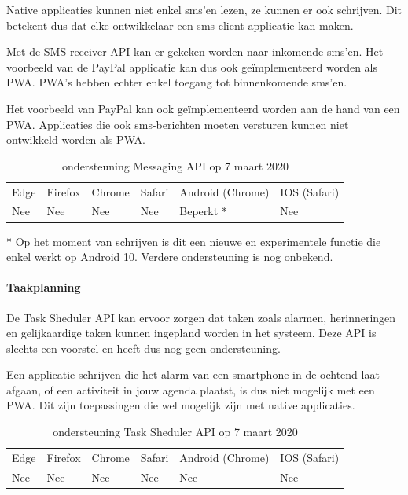 Native applicaties kunnen niet enkel sms’en lezen, ze kunnen er ook schrijven. Dit betekent dus dat elke ontwikkelaar een sms-client applicatie kan maken.

Met de SMS-receiver API \autocite{Fullea2015} kan er gekeken worden naar inkomende sms’en. Het voorbeeld van de PayPal applicatie kan dus ook geïmplementeerd worden als PWA. PWA's hebben echter enkel toegang tot binnenkomende sms’en. 

Het voorbeeld van PayPal kan ook geïmplementeerd worden aan de hand van een PWA. Applicaties die ook sms-berichten moeten versturen kunnen niet ontwikkeld worden als PWA.

\begin{table}[H]
	\centering
	\begin{tabular}{llllll}
		Edge & Firefox & Chrome & Safari & Android (Chrome) & IOS (Safari) \\
		Nee   & Nee      &  Nee     & Nee     & Beperkt *             & Nee          
	\end{tabular}	
	\caption{ondersteuning Messaging API op 7 maart 2020}{* Op het moment van schrijven is dit een nieuwe en experimentele functie die enkel werkt op 
		Android 10. Verdere ondersteuning is nog onbekend.}
\end{table}	



\paragraph{Taakplanning}
De Task Sheduler API \autocite{Kulkarni2015} kan ervoor zorgen dat taken zoals alarmen, herinneringen en gelijkaardige taken kunnen ingepland worden in het systeem. Deze API is slechts een voorstel en heeft dus nog geen ondersteuning.

Een applicatie schrijven die het alarm van een smartphone in de ochtend laat afgaan, of een activiteit in jouw agenda plaatst, is dus niet mogelijk met een PWA. Dit zijn toepassingen die wel mogelijk zijn met native applicaties.

\begin{table}[H]
	\centering
	\begin{tabular}{llllll}
		Edge & Firefox & Chrome & Safari & Android (Chrome) & IOS (Safari) \\
		Nee   & Nee      &  Nee     & Nee     & Nee               & Nee          
	\end{tabular}	
	\caption{ondersteuning Task Sheduler API op 7 maart 2020}
\end{table}	



